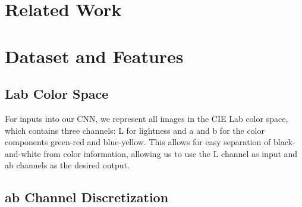 \documentclass{article} %
\begin{document}
\section{Related Work}



\section{Dataset and Features}

\subsection{Lab Color Space}

For inputs into our CNN, we represent all images in the CIE Lab color space, which contains three channels: L for lightness and a and b for the color components green-red and blue-yellow. This allows for easy separation of black-and-white from color information, allowing us to use the L channel as input and ab channels as the desired output.\\

\subsection{ab Channel Discretization}
\end{document}
